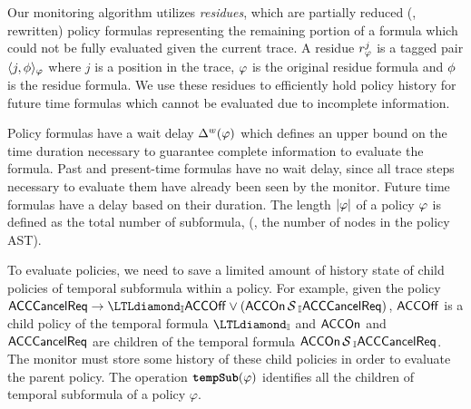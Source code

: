 
Our monitoring algorithm utilizes \emph{residues}, which are partially reduced (\ie, rewritten) policy formulas representing the remaining portion of a formula which could not be fully evaluated given the current trace. A residue $r^j_{\varphi}$ is a tagged pair $\langle j, \phi \rangle_{\varphi}$ where $j$ is a position in the trace, $\varphi$ is the original residue formula and $\phi$ is the residue formula. We use these residues to efficiently hold policy history for future time formulas which cannot be evaluated due to incomplete information.

Policy formulas have a wait delay $\Delta^w(\varphi)$ which defines an upper bound on the time duration necessary to guarantee complete information to evaluate the formula. Past and present-time formulas have no wait delay, since all trace steps necessary to evaluate them have already been seen by the monitor. Future time formulas have a delay based on their duration. The length $|\varphi|$ of a policy $\varphi$ is defined as the total number of subformula, (\ie, the number of nodes in the policy AST).

To evaluate \planguage policies, we need to save a limited amount of history state of child policies of temporal subformula within a policy. For example, given the policy $\pred{ACCCancelReq} \rightarrow \eventually_{\interval} \pred{ACCOff} \vee (\pred{ACCOn} \since_{\interval} \pred{ACCCancelReq})$, $\mathsf{ACCOff}$ is a child policy of the temporal formula $\eventually_{\interval}$ and $\mathsf{ACCOn}$ and $\mathsf{ACCCancelReq}$ are children of the temporal formula $\mathsf{ACCOn} \,\mathrm{\cal S}\,_{\mathbb{I}} \mathsf{ACCCancelReq}$. The monitor must store some history of these child policies in order to evaluate the parent policy.
The operation $\textbf{\texttt{tempSub}}(\varphi)$ identifies all the children of temporal subformula of a policy $\varphi$.


